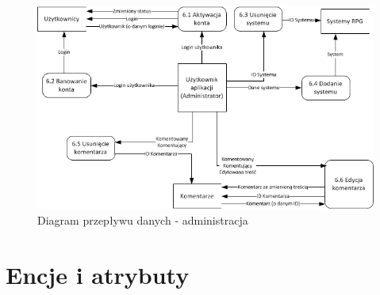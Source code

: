 \begin{figure}[h!]
\begin{center}
\centerline{\includegraphics[scale=1]{./img/DFD-admin.png}}
\caption[Diagram przepływu danych]{Diagram przepływu danych - administracja}
\label{fig:DFD-admin}
\end{center}
\end{figure}



\clearpage
\section{Encje i atrybuty}
\label{sec:encje}

